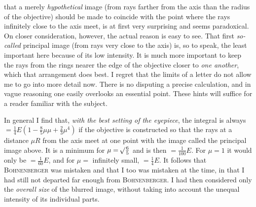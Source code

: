 that a merely \textit{hypothetical} image (from rays farther from the axis than the radius of the objective) should be made to coincide with the point where the rays infinitely close to the axis meet, is at first very surprising and seems paradoxical. On closer consideration, however, the actual reason is easy to see. That first \textit{so-called} principal image (from rays very close to the axis) is, so to speak, the least important here because of its low intensity. It is much more important to keep the rays from the rings nearer the edge of the objective closer to \textit{one another}, which that arrangement does best. I regret that the limits of a letter do not allow me to go into more detail now. There is no disputing a precise calculation, and in vague reasoning one easily overlooks an essential point. These hints will suffice for a reader familiar with the subject.

In general I find that, \textit{with the best setting of the eyepiece}, the integral is always $=\tfrac14E(1-\tfrac85\mu\mu+\tfrac23\mu^4)$ if the objective is constructed so that the rays at a distance $\mu R$ from the axis meet at one point with the image called the principal image above. It is a minimum for $\mu=\mathord{{}^{}\!\surd}\tfrac65$ and is then $=\tfrac{1}{100}E$. For $\mu=1$ it would only be $=\tfrac{1}{60}E$, and for $\mu=$ infinitely small, $=\tfrac14E$. It follows that \textsc{Bohnenberger} was mistaken and that I too was mistaken at the time, in that I had still not departed far enough from \textsc{Bohnenberger}. I had then considered only the \textit{overall size} of the blurred image, without taking into account the unequal intensity of its individual parts.

